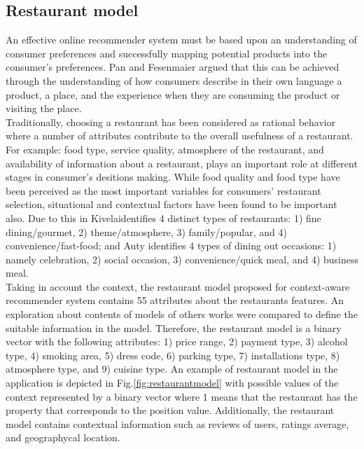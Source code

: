 \subsection{Restaurant model} \label{sec:3.1}

An effective online recommender system must be based upon an understanding of
consumer  preferences and successfully mapping potential products into the
consumer’s preferences\cite{adomavicius2011context}. Pan and
Fesenmaier\cite{pan2006online} argued that this can be achieved through the
understanding of how consumers describe in their own language a product, a
place, and the experience when they are consuming the product or visiting the
place.\\  Traditionally, choosing a restaurant has been considered as rational
behavior where a number of attributes contribute to the overall usefulness of a
restaurant. For example: food type, service quality, atmosphere of the
restaurant, and availability of information about a restaurant, plays an
important role at different stages in consumer’s desitions
making\cite{auty1992consumer}. While food quality and food type have been
perceived as the most important variables for consumers’ restaurant selection,
situational and contextual factors have been found to be important also. Due to
this in Kivela\cite{jack1997restaurant}identifies 4 distinct types of
restaurants: 1) fine dining/gourmet, 2) theme/atmosphere, 3) family/popular, and
4) convenience/fast-food; and Auty\cite{auty1992consumer} identifies 4 types of
dining out occasions: 1) namely celebration, 2) social occasion, 3)
convenience/quick meal, and 4) business meal.\\  Taking in account the context,
the restaurant model proposed for context-aware recommender system contains 55
attributes about the restaurants features. An exploration about contents of
models of others works were compared to define the suitable information in the
model. Therefore, the restaurant model is a binary vector with the following
attributes: 1) price range, 2) payment type, 3) alcohol type, 4) smoking area,
5) dress code, 6) parking type, 7) installations type, 8) atmosphere type, and
9) cuisine type. An example of restaurant model in the application is depicted
in Fig.\ref{fig:restaurantmodel} with possible values of the context represented
by a binary vector where 1 means that the restaurant has the property that
corresponds to the position value. Additionally, the restaurant model contains
contextual information such as reviews of users, ratings average, and
geographycal location.

